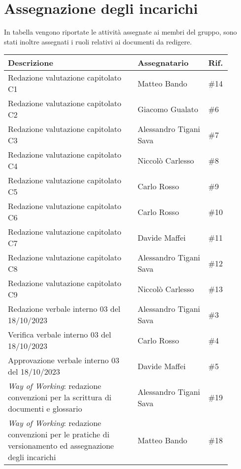 \section{Assegnazione degli incarichi}
In tabella vengono riportate le attività assegnate ai membri del gruppo, sono stati inoltre assegnati i ruoli relativi ai documenti da redigere.

\begin{center}
    {
    \renewcommand{\arraystretch}{1.5}
    \begin{tabular}{p{0.55\linewidth}|p{0.30\linewidth}|p{0.05\linewidth}}
        \textbf{Descrizione}    &   \textbf{Assegnatario}   & \textbf{Rif.}     \\
        \hline
        Redazione valutazione capitolato C1 & Matteo Bando              & \#14  \\
        \hline
        Redazione valutazione capitolato C2 & Giacomo Gualato           & \#6   \\
        \hline
        Redazione valutazione capitolato C3 & Alessandro Tigani Sava    & \#7   \\
        \hline
        Redazione valutazione capitolato C4 & Niccolò Carlesso          & \#8   \\
        \hline
        Redazione valutazione capitolato C5 & Carlo Rosso               & \#9   \\
        \hline
        Redazione valutazione capitolato C6 & Carlo Rosso               & \#10  \\
        \hline
        Redazione valutazione capitolato C7 & Davide Maffei             & \#11  \\
        \hline
        Redazione valutazione capitolato C8 & Alessandro Tigani Sava    & \#12  \\
        \hline
        Redazione valutazione capitolato C9 & Niccolò Carlesso          & \#13  \\
        \hline
        Redazione verbale interno 03 del 18/10/2023    & Alessandro Tigani Sava & \#3 \\
        \hline
        Verifica verbale interno 03 del 18/10/2023     & Carlo Rosso    & \#4   \\
        \hline
        Approvazione verbale interno 03 del 18/10/2023 & Davide Maffei  & \#5   \\
        \hline
        \textit{Way of Working}: redazione convenzioni per la scrittura di documenti e glossario & Alessandro Tigani Sava & \#19 \\
        \hline
        \textit{Way of Working}: redazione convenzioni per le pratiche di versionamento ed assegnazione degli incarichi & Matteo Bando & \#18 \\
    \end{tabular}
    }
    \end{center}